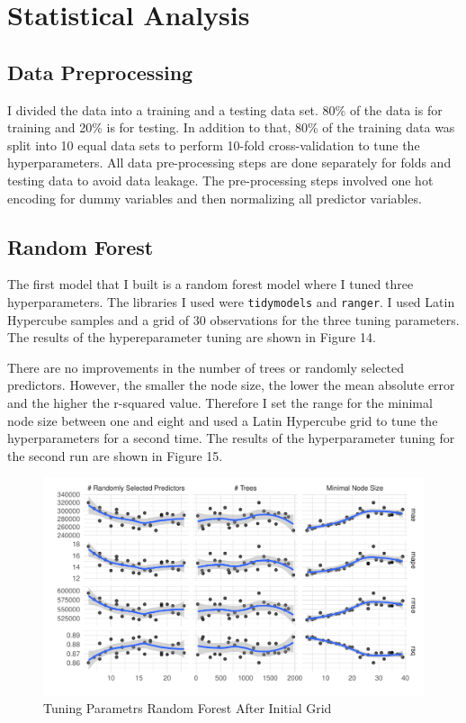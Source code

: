 \documentclass[
]{article}
\begin{document}
\newpage

\hypertarget{statistical-analysis}{%
\section{Statistical Analysis}\label{statistical-analysis}}

\hypertarget{data-preprocessing}{%
\subsection{Data Preprocessing}\label{data-preprocessing}}

I divided the data into a training and a testing data set. 80\% of the
data is for training and 20\% is for testing. In addition to that, 80\%
of the training data was split into 10 equal data sets to perform
10-fold cross-validation to tune the hyperparameters. All data
pre-processing steps are done separately for folds and testing data to
avoid data leakage. The pre-processing steps involved one hot encoding
for dummy variables and then normalizing all predictor variables.

\hypertarget{random-forest}{%
\subsection{Random Forest}\label{random-forest}}

The first model that I built is a random forest model where I tuned
three hyperparameters. The libraries I used were \texttt{tidymodels} and
\texttt{ranger}. I used Latin Hypercube samples and a grid of 30
observations for the three tuning parameters. The results of the
hypereparameter tuning are shown in Figure 14.

There are no improvements in the number of trees or randomly selected
predictors. However, the smaller the node size, the lower the mean
absolute error and the higher the r-squared value. Therefore I set the
range for the minimal node size between one and eight and used a Latin
Hypercube grid to tune the hyperparameters for a second time. The
results of the hyperparameter tuning for the second run are shown in
Figure 15.

\begin{figure}
\centering
\includegraphics{final_report_files/figure-latex/unnamed-chunk-22-1.pdf}
\caption{Tuning Parametrs Random Forest After Initial Grid}
\end{figure}
\end{document}
